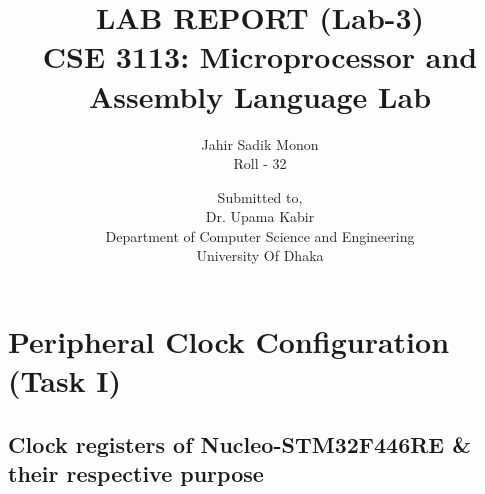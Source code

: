 \documentclass[footheight=20pt, footsepline, headheight=20pt, headsepline]{scrartcl}
\begin{document}
\title{LAB REPORT (Lab-3) \\[1cm] \large{\textbf{CSE 3113: Microprocessor and Assembly Language Lab}}\\[1cm]} 
\author{Jahir Sadik Monon \\ Roll - 32}
\date{\vspace{10cm}  Submitted to, \\[0.1cm] Dr. Upama Kabir \\[0.5cm] Department of Computer Science and Engineering \\[0.5cm] University Of Dhaka}
\maketitle
\newpage
\tableofcontents 
\newpage
\section*{Peripheral Clock Configuration (Task I)}
\subsection*{Clock registers of Nucleo-STM32F446RE \& their respective purpose}
\end{document}
